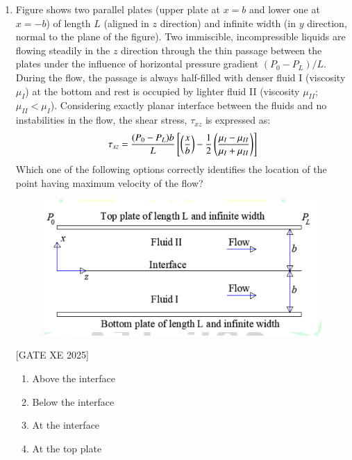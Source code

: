 \documentclass[journal,12pt,onecolumn]{IEEEtran}
\theoremstyle{remark}
\begin{document}
\begin{enumerate}
\item Figure shows two parallel plates (upper plate at $x=b$ and lower one at $x=-b$) of length $L$ (aligned in $z$ direction) and infinite width (in $y$ direction, normal to the plane of the figure). Two immiscible, incompressible liquids are flowing steadily in the $z$ direction through the thin passage between the plates under the influence of horizontal pressure gradient $(P_0-P_L)/L$. During the flow, the passage is always half-filled with denser fluid I (viscosity $\mu_I$) at the bottom and rest is occupied by lighter fluid II (viscosity $\mu_{II}$; $\mu_{II}<\mu_I$). Considering exactly planar interface between the fluids and no instabilities in the flow, the shear stress, $\tau_{xz}$ is expressed as:
\begin{align}
\tau_{xz}=\frac{(P_0-P_L)b}{L}\left[\left(\frac{x}{b}\right)-\frac{1}{2}\left(\frac{\mu_I-\mu_{II}}{\mu_I+\mu_{II}}\right)\right]
\end{align}
Which one of the following options correctly identifies the location of the point having maximum velocity of the flow? \label{q:31}

\begin{figure}[H]
    \centering
    \includegraphics[width=0.5\columnwidth]{figs/fig6.png}
    \caption{}
    \label{fig:placeholder}
\end{figure}


\hfill[GATE XE 2025]

\begin{multicols}{2}
\begin{enumerate}
\item Above the interface
\item Below the interface
\item At the interface
\item At the top plate
\end{enumerate}
\end{multicols}



\end{enumerate}
\end{document}
